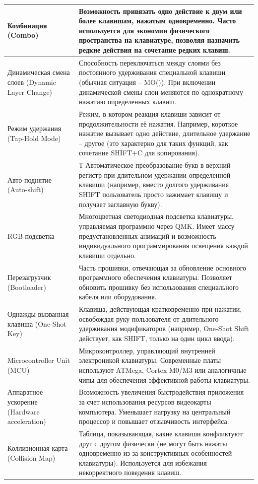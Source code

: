 \begin{xltabular}{\textwidth}{|p{3.6cm}|X|}
	Комбинация (Combo) & Возможность привязать одно действие к двум или более клавишам, нажатым одновременно. Часто используется для экономии физического пространства на клавиатуре, позволяя назначить редкие действия на сочетание редких клавиш. \\ \hline
	Динамическая смена слоев (Dynamic Layer Change) & Способность переключаться между слоями без постоянного удерживания специальной клавиши (обычная ситуация -- MO()). При включении динамической смены слои меняются по однократному нажатию определенных клавиш. \\ \hline
	Режим удержания (Tap-Hold Mode) & Режим, в котором реакция клавиши зависит от продолжительности её нажатия. Например, короткое нажатие вызывает одно действие, длительное удержание -- другое (это характерно для таких функций, как сочетание SHIFT+C для копирования). \\ \hline
	Авто-поднятие (Auto-shift) & Т Автоматическое преобразование букв в верхний регистр при длительном удержании определенной клавиши (например, вместо долгого удерживания SHIFT пользователь просто зажимает клавишу и получает заглавную букву). \\ \hline
	RGB-подсветка & Многоцветная светодиодная подсветка клавиатуры, управляемая программно через QMK. Имеет массу предустановленных анимаций и возможность индивидуального программирования освещения каждой клавиши отдельно. \\ \hline
	Перезагрузчик (Bootloader) & Часть прошивки, отвечающая за обновление основного программного обеспечения клавиатуры. Позволяет обновить прошивку без использования специального кабеля или оборудования. \\ \hline
	Однажды-вызванная клавиша (One-Shot Key) & Клавиша, действующая кратковременно при нажатии, освобождая руку пользователя от длительного удерживания модификаторов (например, One-Shot Shift действует, как SHIFT, только на один цикл ввода). \\ \hline
	Microcontroller Unit (MCU) & Микроконтроллер, управляющий внутренней электроникой клавиатуры. Современные платы используют ATMega, Cortex M0/M3 или аналогичные чипы для обеспечения эффективной работы клавиатуры. \\ \hline
	Аппаратное ускорение (Hardware acceleration) & Возможность увеличения быстродействия приложения за счет использования ресурсов видеокарты компьютера. Уменьшает нагрузку на центральный процессор и повышает отзывчивость интерфейса. \\ \hline
	Коллизионная карта (Collision Map) & Таблица, показывающая, какие клавиши конфликтуют друг с другом физически (не могут быть нажаты одновременно из-за конструктивных особенностей клавиатуры). Используется для избежания некорректного поведения клавиш. \\ \hline

\end{xltabular}
